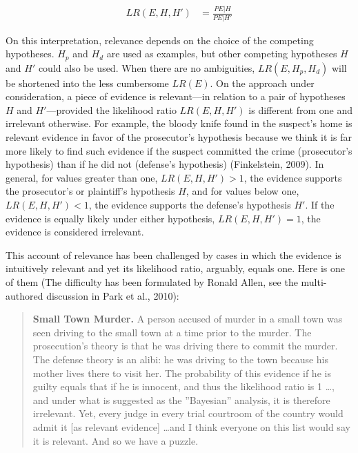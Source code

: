 \documentclass[10pt,dvipsnames,enabledeprecatedfontcommands]{scrartcl}
\begin{document}
\begin{align*}LR(E,H,H') & = \frac{P{E\vert H}}{P{E\vert H'}}
\end{align*}

On this interpretation, relevance depends on the choice of the competing
hypotheses. \(H_p\) and \(H_d\) are used as examples, but other
competing hypotheses \(H\) and \(H'\) could also be used. When there are
no ambiguities, \(LR(E, H_p, H_d)\) will be shortened into the less
cumbersome \(LR(E)\). On the approach under consideration, a piece of
evidence is relevant---in relation to a pair of hypotheses \(H\) and
\(H'\)---provided the likelihood ratio \(LR(E, H, H')\) is different
from one and irrelevant otherwise. For example, the bloody knife found
in the suspect's home is relevant evidence in favor of the prosecutor's
hypothesis because we think it is far more likely to find such evidence
if the suspect committed the crime (prosecutor's hypothesis) than if he
did not (defense's hypothesis) (Finkelstein, 2009). In general, for
values greater than one, \(LR(E, H, H')>1\), the evidence supports the
prosecutor's or plaintiff's hypothesis \(H\), and for values below one,
\(LR(E, H, H')<1\), the evidence supports the defense's hypothesis
\(H'\). If the evidence is equally likely under either hypothesis,
\(LR(E, H, H')=1\), the evidence is considered irrelevant.


This account of relevance has been challenged by cases in which the
evidence is intuitively relevant and yet its likelihood ratio, arguably,
equals one. Here is one of them (The difficulty has been formulated by
Ronald Allen, see the multi-authored discussion in Park et al., 2010):

\begin{quote}
    \textbf{Small Town Murder.} A person accused of murder in a small town was seen driving to the small town at a time prior to the murder. The prosecution's theory is that he was driving there to commit the murder. The defense theory is an alibi: he was driving to the town because his mother lives there to visit her. The probability of this evidence if he is guilty equals that if he is innocent, and thus the likelihood ratio is 1 \dots , and under what is suggested as the ''Bayesian'' analysis, it is therefore irrelevant. 
    Yet, every judge in every trial courtroom of the country would admit it [as relevant evidence] \dots and I think everyone on this list would say it is relevant.  And so we have a puzzle.  
    \end{quote}
\end{document}

